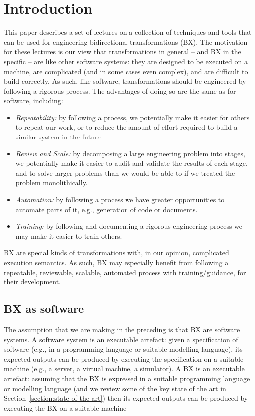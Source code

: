 \section{Introduction}
\label{section:introduction}

This paper describes a set of lectures on a collection of techniques and tools that can be used for engineering bidirectional transformations (BX). The motivation for these lectures is our view that transformations in general -- and BX in the specific -- are like other software systems: they are designed to be executed on a machine, are complicated (and in some cases even complex), and are difficult to build correctly. As such, like software, transformations should be engineered by following a rigorous process. The advantages of doing so are the same as for software, including:
\begin{itemize}
\item \textit{Repeatability:} by following a process, we potentially make it easier for others to repeat our work, or to reduce the amount of effort required to build a similar system in the future.
\item \textit{Review and Scale:} by decomposing a large engineering problem into stages, we potentially make it easier to audit and validate the results of each stage, and to solve larger problems than we would be able to if we treated the problem monolithically.
\item \textit{Automation:} by following a process we have greater opportunities to automate parts of it, e.g., generation of code or documents. 
\item \textit{Training:} by following and documenting a rigorous engineering process we may make it easier to train others.
\end{itemize}
BX are special kinds of transformations with, in our opinion, complicated execution semantics. As such, BX may especially benefit from following a repeatable, reviewable, scalable, automated process with training/guidance, for their development.

\subsection{BX as software}
The assumption that we are making in the preceding is that BX are software systems. A software system is an executable artefact: given a specification of software (e.g., in a programming language or suitable modelling language), its expected outputs can be produced by executing the specification on a suitable machine (e.g., a server, a virtual machine, a simulator). A BX is an executable artefact: assuming that the BX is expressed in a suitable programming language or modelling language (and we review some of the key state of the art in Section~\ref{section:state-of-the-art}) then its expected outputs can be produced by executing the BX on a suitable machine. 

